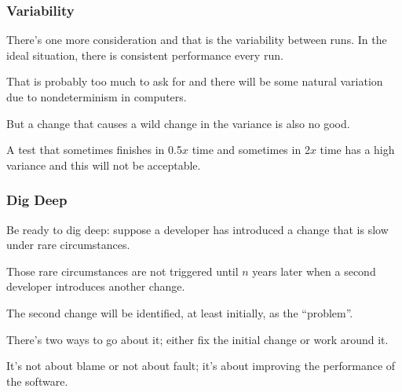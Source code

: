 \begin{frame}
\frametitle{Variability}

There's one more consideration and that is the variability between runs. In the ideal situation, there is consistent performance every run. 

That is probably too much to ask for and there will be some natural variation due to nondeterminism in computers. 

But a change that causes a wild change in the variance is also no good. 

A test that sometimes finishes in 0.5$x$ time and sometimes in 2$x$ time has a high variance and this will not be acceptable. 

\end{frame}



\begin{frame}
\frametitle{Dig Deep}

Be ready to dig deep: suppose a developer has introduced a change that is slow under rare circumstances. 

Those rare circumstances are not triggered until $n$ years later when a second developer introduces another change. 

The second change will be identified, at least initially, as the ``problem''. 

There's two ways to go about it; either fix the initial change or work around it.

It's not about blame or not about fault; it's about improving the performance of the software.

\end{frame}



